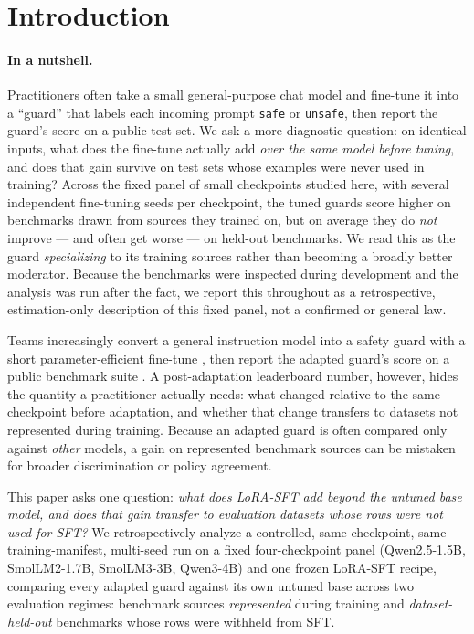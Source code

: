 \documentclass[11pt]{article}
\begin{document}
\section{Introduction}
\label{sec:intro}

\paragraph{In a nutshell.} Practitioners often take a small general-purpose chat model and fine-tune it into a ``guard'' that labels each incoming prompt \texttt{safe} or \texttt{unsafe}, then report the guard's score on a public test set. We ask a more diagnostic question: on identical inputs, what does the fine-tune actually add \emph{over the same model before tuning}, and does that gain survive on test sets whose examples were never used in training? Across the fixed panel of small checkpoints studied here, with several independent fine-tuning seeds per checkpoint, the tuned guards score higher on benchmarks drawn from sources they trained on, but on average they do \emph{not} improve --- and often get worse --- on held-out benchmarks. We read this as the guard \emph{specializing} to its training sources rather than becoming a broadly better moderator. Because the benchmarks were inspected during development and the analysis was run after the fact, we report this throughout as a retrospective, estimation-only description of this fixed panel, not a confirmed or general law.

Teams increasingly convert a general instruction model into a safety guard with a short parameter-efficient fine-tune \cite{elesedy2024loraguard}, then report the adapted guard's score on a public benchmark suite \cite{bassani2024guardbench}. A post-adaptation leaderboard number, however, hides the quantity a practitioner actually needs: what changed relative to the same checkpoint before adaptation, and whether that change transfers to datasets not represented during training. Because an adapted guard is often compared only against \emph{other} models, a gain on represented benchmark sources can be mistaken for broader discrimination or policy agreement.

This paper asks one question: \emph{what does LoRA-SFT add beyond the untuned base model, and does that gain transfer to evaluation datasets whose rows were not used for SFT?} We retrospectively analyze a controlled, same-checkpoint, same-training-manifest, multi-seed run on a fixed four-checkpoint panel (Qwen2.5-1.5B, SmolLM2-1.7B, SmolLM3-3B, Qwen3-4B) and one frozen LoRA-SFT recipe, comparing every adapted guard against its own untuned base across two evaluation regimes: benchmark sources \emph{represented} during training and \emph{dataset-held-out} benchmarks whose rows were withheld from SFT.
\end{document}
